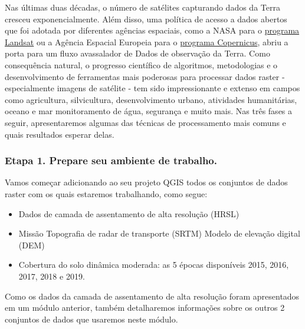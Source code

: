 \documentclass[
]{book}
\providecommand{\tightlist}{%
  \setlength{\itemsep}{0pt}\setlength{\parskip}{0pt}}
\begin{document}
Nas últimas duas décadas, o número de satélites capturando dados da Terra cresceu exponencialmente. Além disso, uma política de acesso a dados abertos que foi adotada por diferentes agências espaciais, como a NASA para o \href{https://www.usgs.gov/core-science-systems/nli/landsat/landsat-data-access?qt-science_support_page_related_con=0\#qt-science_support_page_related_con}{programa Landsat} ou a Agência Espacial Europeia para o \href{https://www.copernicus.eu/en/access-data}{programa Copernicus}, abriu a porta para um fluxo avassalador de Dados de observação da Terra. Como consequência natural, o progresso científico de algoritmos, metodologias e o desenvolvimento de ferramentas mais poderosas para processar dados raster - especialmente imagens de satélite - tem sido impressionante e extenso em campos como agricultura, silvicultura, desenvolvimento urbano, atividades humanitárias, oceano e mar monitoramento de água, segurança e muito mais. Nas três fases a seguir, apresentaremos algumas das técnicas de processamento mais comuns e quais resultados esperar delas.

\hypertarget{etapa-1.-prepare-seu-ambiente-de-trabalho.-1}{%
\subsubsection{\texorpdfstring{\textbf{Etapa 1. Prepare seu ambiente de trabalho.}}{Etapa 1. Prepare seu ambiente de trabalho.}}\label{etapa-1.-prepare-seu-ambiente-de-trabalho.-1}}

Vamos começar adicionando ao seu projeto QGIS todos os conjuntos de dados raster com os quais estaremos trabalhando, como segue:

\begin{itemize}
\tightlist
\item
  Dados de camada de assentamento de alta resolução (HRSL)
\item
  Missão Topografia de radar de transporte (SRTM) Modelo de elevação digital (DEM)
\item
  Cobertura do solo dinâmica moderada: as 5 épocas disponíveis 2015, 2016, 2017, 2018 e 2019.
\end{itemize}

Como os dados da camada de assentamento de alta resolução foram apresentados em um módulo anterior, também detalharemos informações sobre os outros 2 conjuntos de dados que usaremos neste módulo.
\end{document}
